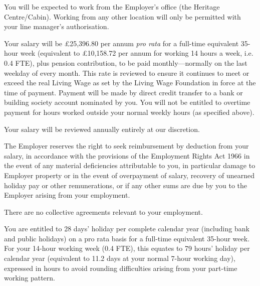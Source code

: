 \documentclass[a4paper,11pt,onecolumn ]{article}
\begin{document}
\begin{legal}
\item {}
You will be expected to work from the Employer's office (the Heritage Centre/Cabin). Working
from any other location will only be permitted with your line manager's authorisation.

\item {}
\begin{legal}
\item Your salary will be £25,396.80 per annum \textit{pro rata} for a full-time equivalent
35-hour week (equivalent to £10,158.72 per annum for working 14 hours a week, i.e. 0.4 FTE),
plus pension contribution, to be paid monthly---normally on the last weekday of every month.
This rate is reviewed to ensure it continues to meet or exceed the real Living Wage
as set by the Living Wage Foundation in force at the time of payment. Payment will be made 
by direct credit transfer 
to a bank or building society account nominated by you. You will not be entitled to overtime
payment for hours worked outside your normal weekly hours (as specified above).
\item Your salary will be reviewed annually entirely at our discretion.
\item The Employer reserves the right to seek reimbursement by deduction from your
salary, in accordance with the provisions of the Employment Rights Act 1966 in
the event of any material deficiencies attributable to you, in particular damage
to Employer property or in the event of overpayment of salary, recovery of
unearned holiday pay or other remunerations, or if any other sums are due by
you to the Employer arising from your employment.
\end{legal}


\item {}
There are no collective agreements relevant to your employment.

\item {}
\begin{legal}
\item You are entitled to 28 days’ holiday per complete calendar year (including bank and 
public holidays) on a pro rata basis for a full-time equivalent 35-hour week. For your 
14-hour working week (0.4 FTE), this equates to 79 hours’ holiday per calendar year
(equivalent to 11.2 days at your normal 7-hour working day), expressed in hours to
avoid rounding difficulties arising from your part-time working pattern.


\end{legal}
\end{legal}
\end{document}
